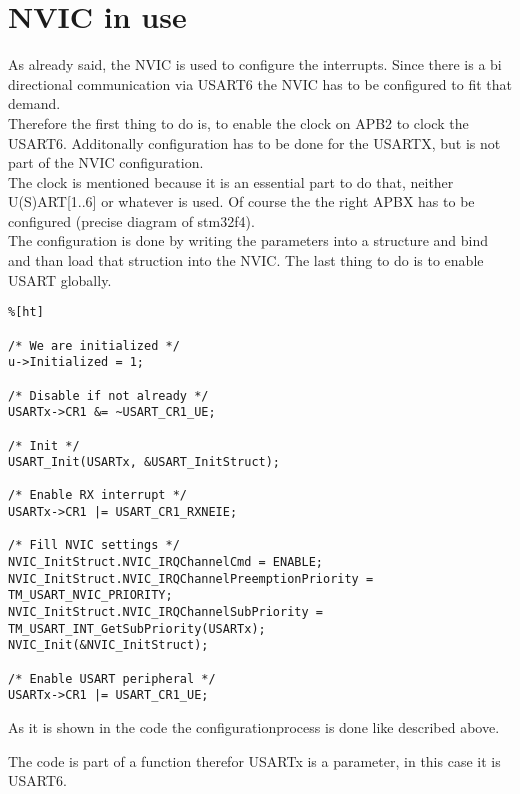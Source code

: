 \chapter{NVIC in use}
As already said, the NVIC is used to configure the interrupts. Since
there is a bi directional communication via USART6 the NVIC has to be
configured to fit that demand.\\
Therefore the first thing to do is, to enable the clock on APB2 to clock
the USART6. Additonally configuration has to be done for the USARTX,
 but is not part of the NVIC configuration.\\
The clock is mentioned because it is an essential part to do that, neither 
U(S)ART[1..6] or whatever is used. Of course the the right APBX has to be
configured (precise diagram of stm32f4).\\
The configuration is done by writing the parameters into a structure and
bind and than load that struction into the NVIC.
The last thing to do is to enable USART globally.

\begin{lstlisting}%[ht]

/* We are initialized */
u->Initialized = 1;

/* Disable if not already */
USARTx->CR1 &= ~USART_CR1_UE;

/* Init */
USART_Init(USARTx, &USART_InitStruct);

/* Enable RX interrupt */
USARTx->CR1 |= USART_CR1_RXNEIE;

/* Fill NVIC settings */
NVIC_InitStruct.NVIC_IRQChannelCmd = ENABLE;
NVIC_InitStruct.NVIC_IRQChannelPreemptionPriority = TM_USART_NVIC_PRIORITY;
NVIC_InitStruct.NVIC_IRQChannelSubPriority = TM_USART_INT_GetSubPriority(USARTx);
NVIC_Init(&NVIC_InitStruct);

/* Enable USART peripheral */
USARTx->CR1 |= USART_CR1_UE;
\end{lstlisting}

As it is shown in the code the configurationprocess is done like described above.

The code is part of a function therefor USARTx is a parameter, in this case it
is USART6.
